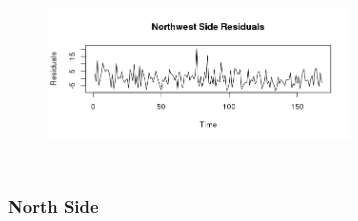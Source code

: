 \documentclass{article} %
\begin{document}
\begin{center}
\begin{figure}[H]
\includegraphics[height=50mm, width=80mm]{Plots/northwest_resids.png}
\end{figure}
\end{center}
 

 
\subsubsection{North Side}
 
\end{document}
